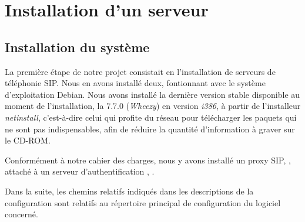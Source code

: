 \section{Installation d’un serveur}

\subsection{Installation du système}

La première étape de notre projet consistait en l’installation de serveurs de téléphonie SIP. Nous en avons installé deux, fontionnant avec le système d’exploitation Debian. Nous avons installé la dernière version stable disponible au moment de l’installation, la 7.7.0 (\textit{Wheezy}) en version \textit{i386}, à partir de l’installeur \textit{netinstall}, c’est-à-dire celui qui profite du réseau pour télécharger les paquets qui ne sont pas indispensables, afin de réduire la quantité d’information à graver sur le CD-ROM.

Conformément à notre cahier des charges, nous y avons installé un proxy SIP, {\kam}, attaché à un serveur d’authentification {\rad}, {\frad}.

Dans la suite, les chemins relatifs indiqués dans les descriptions de la configuration sont relatifs au répertoire principal de configuration du logiciel concerné.

\newpage



